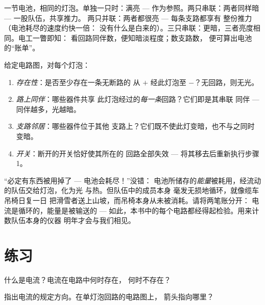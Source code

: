 \begin{example}[借助电工的眼光读亮度]\label{ex:g7:circuits-series-parallel:brightness}
一节电池，相同的灯泡。单独一只时：满亮 ---
作为参照。两只串联：两者同样暗 --- 一股队伍，共享推力。
两只并联：两者都很亮 --- 每条支路都享有
整份推力（电池耗尽的速度约快一倍：
没有什么是白来的）。三只串联：更暗，三者亮度相同。电工一瞥即知：
看回路同伴数，便知暗淡程度；数支路数，
便可算出电池的“账单”。
\end{example}

\begin{method}[预判任一灯泡的命运]\label{met:g7:circuits-series-parallel:predict}
给定电路图，对每个灯泡：
\begin{enumerate}
  \item \emph{存在性}：是否至少存在一条无断路的
        从 $+$ 经此灯泡至 $-$？无回路，则无光。
  \item \emph{路上同伴}：哪些器件共享
        此灯泡经过的\emph{每一条}回路？它们即是其串联
        同伴 --- 同伴越多，光越暗。
  \item \emph{支路邻居}：哪些器件位于其他
        支路上？它们既不使此灯变暗，也不与之同时变暗。
  \item \emph{开关}：断开的开关恰好使其所在的
        回路全部失效 --- 将其移去后重新执行步骤 1。
\end{enumerate}
\end{method}

\begin{remark}[这一误解为何根深蒂固]\label{rem:g7:circuits-series-parallel:whyhard}
“必定有东西被用掉了 --- 电池会耗尽！”没错：
电池所储存的\emph{能量}被耗用，经流动的队伍交给灯泡，化为光
与热。但队伍中的成员本身
毫发无损地循环，就像缆车吊椅日复一日
把滑雪者送上山坡，而吊椅本身从未被消耗。请将两笔账分开：
电流是循环的，能量是被输送的 ---
如此，本书中的每个电路都经得起检验。用来计数队伍本身的仪器
明年才会与我们相见。
\end{remark}

\section{练习}

\begin{exercise}[$\star$]\label{exo:g7:circuits-series-parallel:1}
什么是电流？电流在电路中何时存在，
何时不存在？
\end{exercise}

\begin{exercise}[$\star$]\label{exo:g7:circuits-series-parallel:2}
指出电流的规定方向。在单灯泡回路的电路图上，
箭头指向哪里？
\end{exercise}

